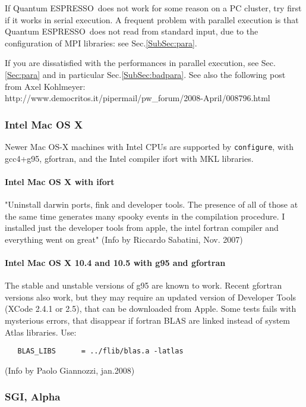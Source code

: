 \documentclass[12pt,a4paper]{article}
\def\qe{{\sc Quantum ESPRESSO}}
\def\configure{\texttt{configure}}
\begin{document}
If \qe\ does not work for some reason on a PC cluster,
try first if it works in serial execution. A frequent problem with parallel
execution is that \qe\ does not read from standard input,
due to the configuration of MPI libraries: see Sec.\ref{SubSec:para}.

If you are dissatisfied with the performances in parallel execution,
see Sec.\ref{Sec:para} and in particular Sec.\ref{SubSec:badpara}.
See also the following post from Axel Kohlmeyer:\\
http://www.democritos.it/pipermail/pw\_forum/2008-April/008796.html

\subsubsection{Intel Mac OS X}

Newer Mac OS-X machines with Intel CPUs are supported by \configure,
with gcc4+g95, gfortran, and the Intel compiler ifort with MKL libraries.

\paragraph{Intel Mac OS X with ifort}

"Uninstall darwin ports, fink and developer tools. The presence of all of
those at the same time generates many spooky events in the compilation
procedure.  I installed just the developer tools from apple, the intel
fortran compiler and everything went on great" (Info by Riccardo Sabatini, 
Nov. 2007)

\paragraph{Intel Mac OS X 10.4 and 10.5 with g95 and gfortran}

The stable and unstable versions of g95 are known to work. Recent
gfortran versions also work, but they may require an updated version
of Developer Tools (XCode 2.4.1 or 2.5), that can be downloaded from
Apple. Some tests fails with mysterious errors, that disappear if
fortran BLAS are linked instead of system Atlas libraries. Use: 
\begin{verbatim}
   BLAS_LIBS      = ../flib/blas.a -latlas
\end{verbatim}
(Info by Paolo Giannozzi, jan.2008)

\subsubsection{SGI, Alpha}
\end{document}
